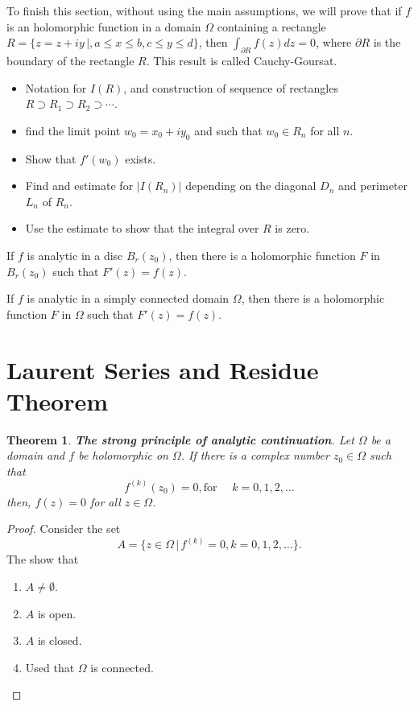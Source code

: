 \documentclass{amsart}
\newtheorem{thm}{Theorem}
\begin{document}
To finish this section, without using the main assumptions, we will prove that if \(f\) is an holomorphic function in a domain \(\Omega\) containing a rectangle \(R = \{ z = z + iy \, | , a\leq x \leq b, c \leq y \leq d \}\), then \(\int_{\partial R} f(z) dz = 0\), where \(\partial R\) is the boundary of the rectangle \(R\).
This result is called Cauchy-Goursat.

\begin{itemize}
\item Notation for \(I(R)\), and construction of sequence of rectangles \(R \supset R_1 \supset R_2 \supset \cdots\).
\item find the limit point \(w_0 = x_0+ i y_0\) and such that \(w_0 \in R_{n}\) for all \(n\).
\item Show that \(f'(w_0)\) exists.
\item Find and estimate for \(|I(R_n)|\) depending on the diagonal \(D_n\) and perimeter \(L_n\) of \(R_n\).
\item Use the estimate to show that the integral over \(R\) is zero.
\end{itemize}

If \(f\) is analytic in a disc \(B_r(z_0)\), then there is a holomorphic function \(F\) in \(B_r(z_0)\) such that \(F'(z) = f(z)\).

If \(f\) is analytic in a simply connected domain \(\Omega\), then there is a holomorphic function \(F\) in \(\Omega\) such that \(F'(z) = f(z)\).



\section{Laurent Series and Residue Theorem}
\label{sec:org2bcf4f3}

\begin{thm}
\textbf{The strong principle of analytic continuation}. Let \(\Omega\) be a domain and \(f\) be holomorphic on \(\Omega\). If there is a complex number \(z_0\in\Omega\) such that
\[ f^{(k)}(z_0) = 0, \mbox{for }\quad k = 0,1,2,\ldots \]
then, \(f(z) = 0\) for all \(z\in \Omega\).
\end{thm}
\begin{proof}
Consider the set 
\[ A = \{ z \in \Omega \, | \, f^{(k)} = 0, k = 0,1,2,\ldots \}. \]
The show that
\begin{enumerate}
\item \(A \neq \emptyset\).
\item \(A\) is open.
\item \(A\) is closed.
\item Used that \(\Omega\) is connected.
\end{enumerate}
\end{proof}
\end{document}
